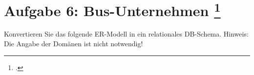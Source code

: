 \documentclass{lehramt-informatik-aufgabe}
\begin{document}

\section{Aufgabe 6: Bus-Unternehmen
\footcite{db:ab:klausurvorbereitung}}

Konvertieren Sie das folgende ER-Modell in ein relationales DB-Schema.
Hinweis: Die Angabe der Domänen ist nicht notwendig!
\end{document}
